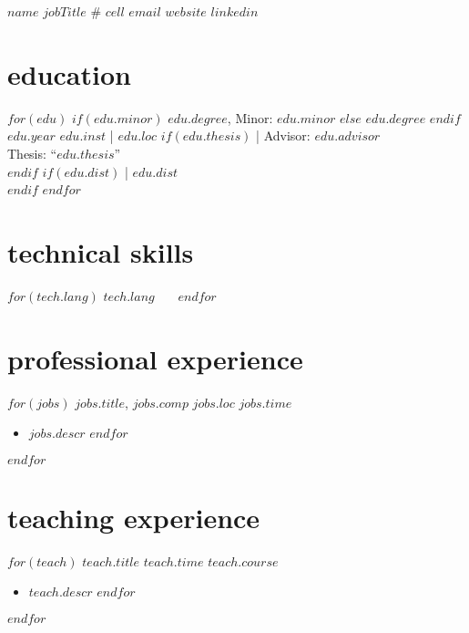 \documentclass[]{friggeri-cv}
\begin{document}
\header
  {$name$}
  {$jobTitle$}
  {\# $cell$}
  {\href{mailto:$email$}{$email$}}
  {\href{$website$}{$website$}}
  {\href{$linkedin$}{$linkedin$}}



\vspace{-0.4in}
\section{education}
\begin{entrylist}
$for(edu)$
  \entrypub
  $if(edu.minor)$
    {$edu.degree$, Minor: $edu.minor$}
  $else$
    {$edu.degree$}
  $endif$
  {$edu.year$}
  {$edu.inst$ | $edu.loc$}
  $if(edu.thesis)$
    { | Advisor: $edu.advisor$}\\
    {Thesis: ``$edu.thesis$''}\\
  $endif$
  $if(edu.dist)$
    { | $edu.dist$}\\
  $endif$
$endfor$
\end{entrylist}



\vspace{-0.15in}
\section{technical skills}
\begin{changemargin}{0.35in}{0in}
$for(tech.lang)$
  \textbf{$tech.lang$} \, \, \,
$endfor$
\end{changemargin}



\vspace{-0.05in}
\section{professional experience}
\begin{entrylist}
$for(jobs)$
  \entryalt
  {\textit{$jobs.title$}, $jobs.comp$}
  {$jobs.loc$}
  {$jobs.time$}
  \setlength\parskip{0pt}
  \begin{itemize}[noitemsep, leftmargin=0.2in]
    $for(jobs.descr)$
      \item $jobs.descr$
    $endfor$
  \end{itemize}
  \setlength\parskip{12pt}
$endfor$
\end{entrylist}



\vspace{-0.05in}
\section{teaching experience}
\begin{entrylist}
$for(teach)$
  \entrypub
  {$teach.title$}
  {$teach.time$}
  {$teach.course$}
  \setlength\parskip{0pt}
  \begin{itemize}[noitemsep, leftmargin=0.2in]
    $for(teach.descr)$
      \item $teach.descr$
    $endfor$
  \end{itemize}
  \setlength\parskip{12pt}
$endfor$
\end{entrylist}
\end{document}
